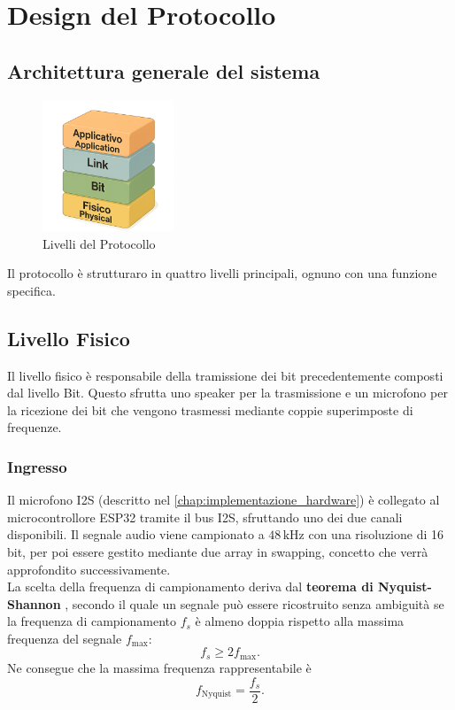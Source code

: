 \chapter{Design del Protocollo}
\label{chap:design_protocollo}
\section{Architettura generale del sistema}
\begin{figure}[H]
    \centering
    \includegraphics[width=0.35\textwidth]{immagini/layers.png}
    \caption{Livelli del Protocollo}
    \label{fig:layers}
\end{figure}
Il protocollo è strutturaro in quattro livelli principali, ognuno con una funzione specifica.
\section{Livello Fisico}
\label{sec:livello_fisico}
Il livello fisico è responsabile della tramissione dei bit precedentemente composti dal livello Bit.
Questo sfrutta uno speaker per la trasmissione e un microfono per la ricezione dei bit che vengono trasmessi mediante coppie superimposte di frequenze.
\subsection{Ingresso}
\label{sec:ingresso_livello_fisico}
Il microfono I2S (descritto nel \autoref{chap:implementazione_hardware}) è collegato al microcontrollore ESP32 tramite il bus I2S, sfruttando uno dei due canali disponibili.  
Il segnale audio viene campionato a $48\,\text{kHz}$ con una risoluzione di 16 bit, per poi essere gestito mediante due array in swapping, concetto che verrà approfondito successivamente. \\

\noindent
La scelta della frequenza di campionamento deriva dal \textbf{teorema di Nyquist-Shannon} \cite{shannon1949}, secondo il quale un segnale può essere ricostruito senza ambiguità se la frequenza di campionamento $f_s$ è almeno doppia rispetto alla massima frequenza del segnale $f_{\max}$:
\[
f_s \geq 2 f_{\max}.
\]
Ne consegue che la massima frequenza rappresentabile è
\[
f_{\text{Nyquist}} = \frac{f_s}{2}.
\]

